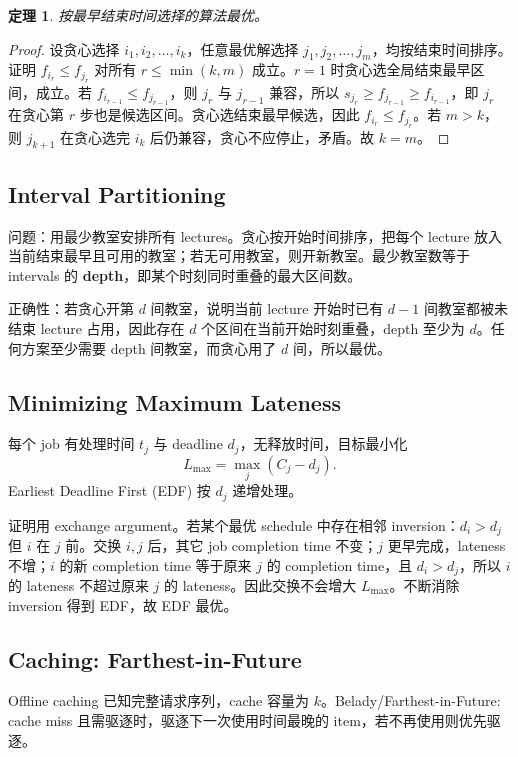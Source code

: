 \documentclass[UTF8,a4paper,11pt]{ctexart}
\newtheorem{theorem}{定理}[section]
\begin{document}
\begin{theorem}
按最早结束时间选择的算法最优。
\end{theorem}
\begin{proof}
设贪心选择 $i_1,i_2,\ldots,i_k$，任意最优解选择 $j_1,j_2,\ldots,j_m$，均按结束时间排序。证明 $f_{i_r}\le f_{j_r}$ 对所有 $r\le \min(k,m)$ 成立。$r=1$ 时贪心选全局结束最早区间，成立。若 $f_{i_{r-1}}\le f_{j_{r-1}}$，则 $j_r$ 与 $j_{r-1}$ 兼容，所以 $s_{j_r}\ge f_{j_{r-1}}\ge f_{i_{r-1}}$，即 $j_r$ 在贪心第 $r$ 步也是候选区间。贪心选结束最早候选，因此 $f_{i_r}\le f_{j_r}$。若 $m>k$，则 $j_{k+1}$ 在贪心选完 $i_k$ 后仍兼容，贪心不应停止，矛盾。故 $k=m$。
\end{proof}

\subsection{Interval Partitioning}

问题：用最少教室安排所有 lectures。贪心按开始时间排序，把每个 lecture 放入当前结束最早且可用的教室；若无可用教室，则开新教室。最少教室数等于 intervals 的 \textbf{depth}，即某个时刻同时重叠的最大区间数。

正确性：若贪心开第 $d$ 间教室，说明当前 lecture 开始时已有 $d-1$ 间教室都被未结束 lecture 占用，因此存在 $d$ 个区间在当前开始时刻重叠，depth 至少为 $d$。任何方案至少需要 depth 间教室，而贪心用了 $d$ 间，所以最优。

\subsection{Minimizing Maximum Lateness}

每个 job 有处理时间 $t_j$ 与 deadline $d_j$，无释放时间，目标最小化
\[
L_{\max}=\max_j(C_j-d_j).
\]
Earliest Deadline First (EDF) 按 $d_j$ 递增处理。

证明用 exchange argument。若某个最优 schedule 中存在相邻 inversion：$d_i>d_j$ 但 $i$ 在 $j$ 前。交换 $i,j$ 后，其它 job completion time 不变；$j$ 更早完成，lateness 不增；$i$ 的新 completion time 等于原来 $j$ 的 completion time，且 $d_i>d_j$，所以 $i$ 的 lateness 不超过原来 $j$ 的 lateness。因此交换不会增大 $L_{\max}$。不断消除 inversion 得到 EDF，故 EDF 最优。

\subsection{Caching: Farthest-in-Future}

Offline caching 已知完整请求序列，cache 容量为 $k$。Belady/Farthest-in-Future: cache miss 且需驱逐时，驱逐下一次使用时间最晚的 item，若不再使用则优先驱逐。
\end{document}
